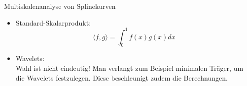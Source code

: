 {%

\begin{frame}{Multiskalenanalyse von Splinekurven}
\begin{itemize}
\item Standard-Skalarprodukt:
\[
\langle f,g\rangle =\int_0^1f(x)g(x)dx
\]
\item Wavelets:\\
Wahl ist nicht eindeutig! Man verlangt zum Beispiel minimalen Träger, um die Wavelets festzulegen. Diese beschleunigt zudem die Berechnungen.
\end{itemize}
\end{frame}

}




%	
%			
